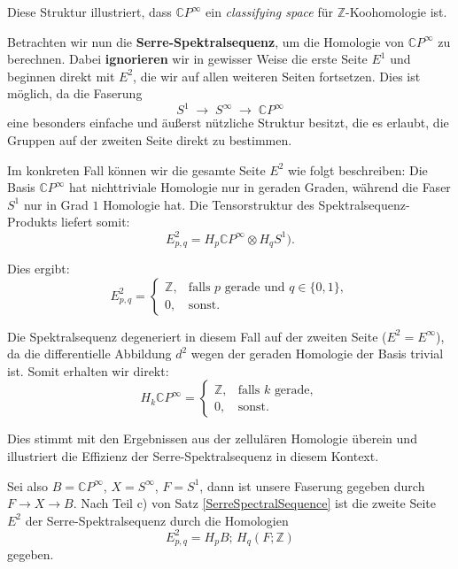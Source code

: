 \documentclass[12pt]{article}
\numberwithin{conj}{section}
\begin{document}
    Diese Struktur illustriert, dass $\mathbb{C}P^{\infty}$ ein \textit{classifying
    space} für $\mathbb{Z}$-Koohomologie ist.

    \smallskip

    Betrachten wir nun die \textbf{Serre-Spektralsequenz}, um die Homologie von $\mathbb{C}
    P^{\infty}$ zu berechnen. Dabei \textbf{ignorieren} wir in gewisser Weise die erste
    Seite $E^{1}$ und beginnen direkt mit $E^{2}$, die wir auf allen weiteren
    Seiten fortsetzen. Dies ist möglich, da die Faserung
    \[
        S^{1} \;\longrightarrow\; S^{\infty} \;\longrightarrow\; \mathbb{C}P^{\infty}
    \]
    eine besonders einfache und äußerst nützliche Struktur besitzt, die es erlaubt,
    die Gruppen auf der zweiten Seite direkt zu bestimmen.

    Im konkreten Fall können wir die gesamte Seite $E^{2}$ wie folgt beschreiben: Die
    Basis $\mathbb{C}P^{\infty}$ hat nichttriviale Homologie nur in geraden Graden,
    während die Faser $S^{1}$ nur in Grad $1$ Homologie hat. Die Tensorstruktur des
    Spektralsequenz-Produkts liefert somit:
    \[
        E^{2}_{p,q}= H_{p} \mathbb{C}P^{\infty}  \otimes H_{q} S^{1}\bigr
        ).
    \]

    Dies ergibt:
    \[
        E^{2}_{p,q}=
        \begin{cases}
            \mathbb{Z}, & \text{falls } p \text{ gerade und } q \in \{0,1\}, \\
            0,          & \text{sonst}.
        \end{cases}
    \]

    Die Spektralsequenz degeneriert in diesem Fall auf der zweiten Seite ($E^{2} =
    E^{\infty}$), da die differentielle Abbildung $d^{2}$ wegen der geraden
    Homologie der Basis trivial ist. Somit erhalten wir direkt:
    \[
        H_{k} \mathbb{C}P^{\infty}  =
        \begin{cases}
            \mathbb{Z}, & \text{falls } k \text{ gerade}, \\
            0,          & \text{sonst}.
        \end{cases}
    \]

    Dies stimmt mit den Ergebnissen aus der zellulären Homologie überein und illustriert
    die Effizienz der Serre-Spektralsequenz in diesem Kontext.

    Sei also $B = \mathbb{C}P^{\infty}$, $X = S^{\infty}$, $F = S^{1}$, dann ist
    unsere Faserung gegeben durch $F \to X \to B$. Nach Teil c) von Satz
    \ref{SerreSpectralSequence} ist die zweite Seite $E^{2}$ der Serre-Spektralsequenz
    durch die Homologien
    \[
        E^{2}_{p,q}= H_{p} B;\, H_{q}(F;\mathbb{Z}) 
    \]
    gegeben.
\end{document}
